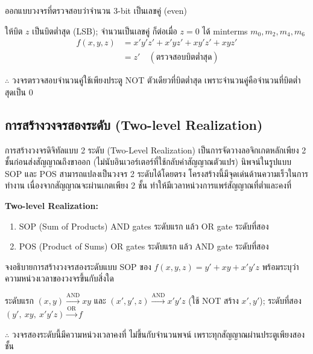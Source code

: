 \begin{ex}[การออกแบบวงจรตรวจสอบจำนวนคู่]
\label{ex:even-detector}
ออกแบบวงจรที่ตรวจสอบว่าจำนวน 3-bit เป็นเลขคู่ (even)
\end{ex}
\begin{solution}
ให้บิต $z$ เป็นบิตต่ำสุด (LSB); จำนวนเป็นเลขคู่ ก็ต่อเมื่อ $z = 0$ ได้ minterms $m_0, m_2, m_4, m_6$
\begin{align*}
f(x, y, z) &= x'y'z' + x'yz' + xy'z' + xyz'\\
&= z' \quad (\text{ตรวจสอบบิตต่ำสุด})
\end{align*}

$\therefore$ วงจรตรวจสอบจำนวนคู่ใช้เพียงประตู NOT ตัวเดียวที่บิตต่ำสุด เพราะจำนวนคู่คือจำนวนที่บิตต่ำสุดเป็น 0 \solhere
\end{solution}

\subsection{การสร้างวงจรสองระดับ (Two-level Realization)}
\label{sec:two-level}
การสร้างวงจรดิจิทัลแบบ 2 ระดับ (Two-Level Realization) เป็นการจัดวางลอจิกเกตหลักเพียง 2 ชั้นก่อนส่งสัญญาณถึงขาออก (ไม่นับอินเวอร์เตอร์ที่ใช้กลับค่าสัญญาณตัวแปร) นิพจน์ในรูปแบบ SOP และ POS สามารถแปลงเป็นวงจร 2 ระดับได้โดยตรง โครงสร้างนี้มีจุดเด่นด้านความเร็วในการทำงาน เนื่องจากสัญญาณจะผ่านเกตเพียง 2 ชั้น ทำให้มีเวลาหน่วงการแพร่สัญญาณที่ต่ำและคงที่~\parencite{wakerly2018digital}

\begin{principle}
\textbf{Two-level Realization:}
\begin{enumerate}
    \item SOP (Sum of Products) AND gates ระดับแรก แล้ว OR gate ระดับที่สอง
    \item POS (Product of Sums) OR gates ระดับแรก แล้ว AND gate ระดับที่สอง
\end{enumerate}
\end{principle}

\begin{ex}
\label{ex:two-level-sop}
จงอธิบายการสร้างวงจรสองระดับแบบ SOP ของ $f(x, y, z) = y' + x y + x' y' z$ พร้อมระบุว่าความหน่วงเวลาของวงจรขึ้นกับสิ่งใด
\end{ex}
\begin{solution}
ระดับแรก $(x,y) \xrightarrow{\text{AND}} xy$ และ $(x',y',z) \xrightarrow{\text{AND}} x'y'z$ (ใช้ NOT สร้าง $x', y'$); ระดับที่สอง $(y',\ xy,\ x'y'z) \xrightarrow{\text{OR}} f$

$\therefore$ วงจรสองระดับนี้มีความหน่วงเวลาคงที่ ไม่ขึ้นกับจำนวนพจน์ เพราะทุกสัญญาณผ่านประตูเพียงสองชั้น \solhere
\end{solution}

